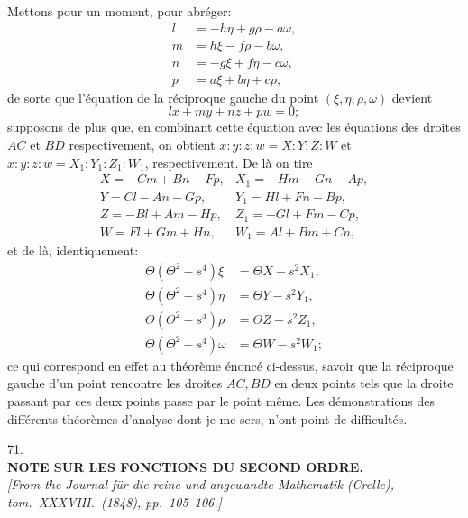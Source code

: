 \documentclass[10pt]{article}
\newcommand{\qedpage}{\vfill\pagebreak}
\begin{document}
Mettons pour un moment, pour abr\'eger:
\[
\begin{aligned}
l&=-h\eta+g\rho-a\omega,\\
m&=h\xi-f\rho-b\omega,\\
n&=-g\xi+f\eta-c\omega,\\
p&=a\xi+b\eta+c\rho,
\end{aligned}
\]
de sorte que l'\'equation de la r\'eciproque gauche du point $(\xi,\eta,\rho,\omega)$
devient
\[
lx+my+nz+pw=0;
\]
supposons de plus que, en combinant cette \'equation avec les \'equations des droites
$AC$ et $BD$ respectivement, on obtient $x:y:z:w=X:Y:Z:W$ et
$x:y:z:w=X_1:Y_1:Z_1:W_1$, respectivement. De l\`a on tire
\[
\begin{array}{ll}
X=-Cm+Bn-Fp, & X_1=-Hm+Gn-Ap,\\
Y=Cl-An-Gp, & Y_1=Hl+Fn-Bp,\\
Z=-Bl+Am-Hp, & Z_1=-Gl+Fm-Cp,\\
W=Fl+Gm+Hn, & W_1=Al+Bm+Cn,
\end{array}
\]
et de l\`a, identiquement:
\[
\begin{aligned}
\Theta(\Theta^2-s^4)\xi&=\Theta X-s^2X_1,\\
\Theta(\Theta^2-s^4)\eta&=\Theta Y-s^2Y_1,\\
\Theta(\Theta^2-s^4)\rho&=\Theta Z-s^2Z_1,\\
\Theta(\Theta^2-s^4)\omega&=\Theta W-s^2W_1;
\end{aligned}
\]
ce qui correspond en effet au th\'eor\`eme \'enonc\'e ci-dessus, savoir que la
r\'eciproque gauche d'un point rencontre les droites $AC,BD$ en deux points tels que
la droite passant par ces deux points passe par le point m\^eme. Les d\'emonstrations
des diff\'erents th\'eor\`emes d'analyse dont je me sers, n'ont point de difficult\'es.
\qedpage

\begin{center}
{\Large 71.}\\[2em]
{\large\bfseries NOTE SUR LES FONCTIONS DU SECOND ORDRE.}\\[1.5em]
\textit{[From the Journal f\"ur die reine und angewandte Mathematik (Crelle),
tom.\ XXXVIII.\ (1848), pp.~105--106.]}
\end{center}
\end{document}
